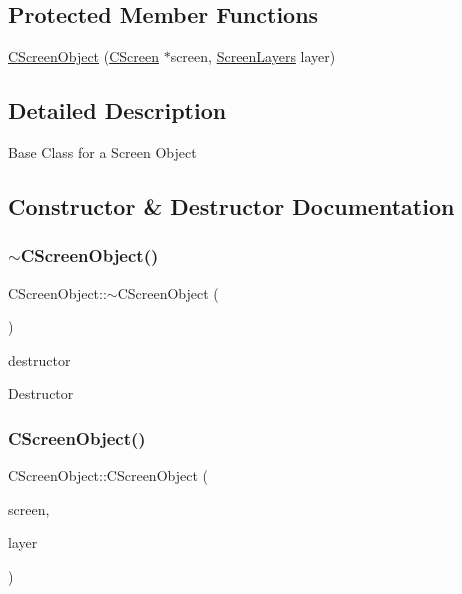 \subsection*{Protected Member Functions}
\begin{DoxyCompactItemize}
\item 
\mbox{\hyperlink{class_c_screen_object_a36d19374c1335693aa31cda5499b85da}{C\+Screen\+Object}} (\mbox{\hyperlink{class_c_screen}{C\+Screen}} $\ast$screen, \mbox{\hyperlink{_screen_layers_8h_ac283065f0e546466dc00cf224c28d5ac}{Screen\+Layers}} layer)
\end{DoxyCompactItemize}


\subsection{Detailed Description}
Base Class for a Screen Object 

\subsection{Constructor \& Destructor Documentation}
\mbox{\label{class_c_screen_object_a4d71a9079b9e3558fed4d65ccda628b4}} 
\subsubsection{\texorpdfstring{$\sim$CScreenObject()}{~CScreenObject()}}
{\footnotesize\ttfamily C\+Screen\+Object\+::$\sim$\+C\+Screen\+Object (\begin{DoxyParamCaption}{ }\end{DoxyParamCaption})\hspace{0.3cm}{\ttfamily [virtual]}}



destructor 

Destructor \mbox{\label{class_c_screen_object_a36d19374c1335693aa31cda5499b85da}} 
\subsubsection{\texorpdfstring{CScreenObject()}{CScreenObject()}}
{\footnotesize\ttfamily C\+Screen\+Object\+::\+C\+Screen\+Object (\begin{DoxyParamCaption}\item[{\mbox{\hyperlink{class_c_screen}{C\+Screen}} $\ast$}]{screen,  }\item[{\mbox{\hyperlink{_screen_layers_8h_ac283065f0e546466dc00cf224c28d5ac}{Screen\+Layers}}}]{layer }\end{DoxyParamCaption})\hspace{0.3cm}{\ttfamily [protected]}}

